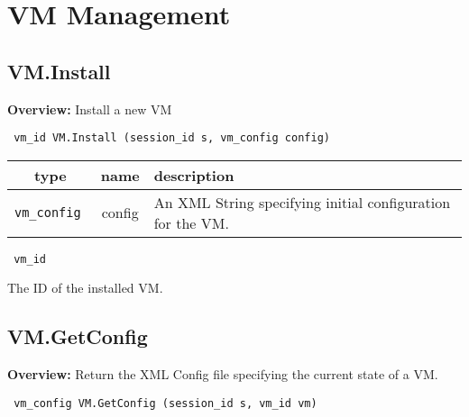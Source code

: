 \vspace{0.3cm}
\vspace{0.3cm}
\vspace{0.3cm}



\newpage\section{VM Management}

\subsection{VM.Install}

{\bf Overview:} 
Install a new VM

\begin{verbatim} vm_id VM.Install (session_id s, vm_config config)\end{verbatim}



 
\vspace{0.3cm}
\begin{tabular}{|c|c|p{7cm}|}
 \hline
{\bf type} & {\bf name} & {\bf description} \\ \hline
{\tt vm\_config } & config & An XML String specifying initial configuration for the VM. \\ \hline 

\end{tabular}

\vspace{0.3cm}

{\tt 
vm\_id
}


The ID of the installed VM.
\vspace{0.3cm}
\vspace{0.3cm}
\vspace{0.3cm}

\subsection{VM.GetConfig}

{\bf Overview:} 
Return the XML Config file specifying the current state of a VM.

\begin{verbatim} vm_config VM.GetConfig (session_id s, vm_id vm)\end{verbatim}



